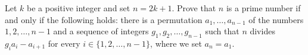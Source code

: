 Let $k$ be a positive integer and set $n = 2k + 1$. Prove that $n$ is a prime number if and only if the following holds: there is a permutation $a_1, \ldots, a_{n-1}$ of the numbers $1, 2, \ldots, n - 1$ and a sequence of integers $g_1, g_2, \ldots, g_{n-1}$ such that $n$ divides $g_i a_i - a_{i+1}$ for every $i \in \{1, 2, \ldots, n - 1\}$, where we set $a_n = a_1$.
